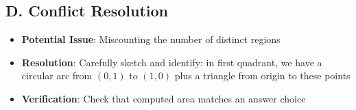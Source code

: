 \documentclass[]{article}
\begin{document}
\begin{techniquesbox}
\subsection*{D. Conflict Resolution}
\begin{itemize}[leftmargin=*]
    \item \textbf{Potential Issue}: Miscounting the number of distinct regions
    \item \textbf{Resolution}: Carefully sketch and identify: in first quadrant, we have a circular arc from $(0,1)$ to $(1,0)$ plus a triangle from origin to these points
    \item \textbf{Verification}: Check that computed area matches an answer choice
\end{itemize}
\end{techniquesbox}
\end{document}
